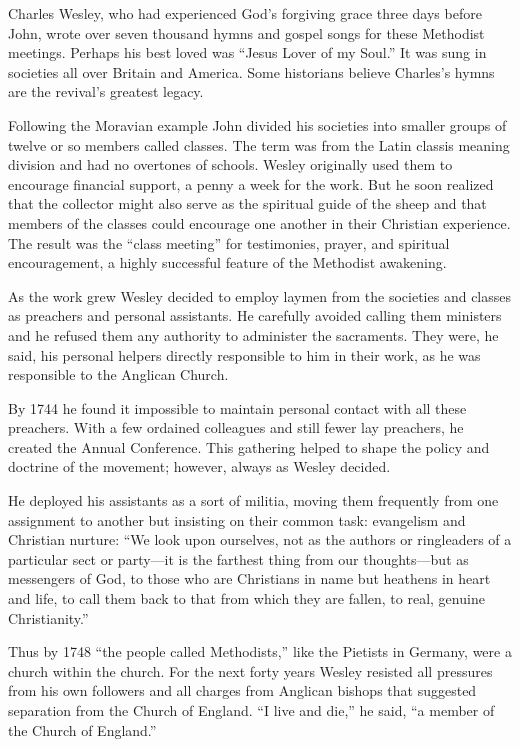 Charles Wesley, who had experienced God’s forgiving grace three days before John, wrote over seven
thousand hymns and gospel songs for these Methodist meetings. Perhaps his best loved was “Jesus
Lover of my Soul.” It was sung in societies all over Britain and America. Some historians believe
Charles’s hymns are the revival’s greatest legacy.

Following the Moravian example John divided his societies into smaller groups of twelve or so
members called classes. The term was from the Latin classis meaning division and had no overtones of
schools. Wesley originally used them to encourage financial support, a penny a week for the work.
But he soon realized that the collector might also serve as the spiritual guide of the sheep and
that members of the classes could encourage one another in their Christian experience. The result
was the “class meeting” for testimonies, prayer, and spiritual encouragement, a highly successful
feature of the Methodist awakening.

As the work grew Wesley decided to employ laymen from the societies and classes as preachers and
personal assistants. He carefully avoided calling them ministers and he refused them any authority
to administer the sacraments. They were, he said, his personal helpers directly responsible to him
in their work, as he was responsible to the Anglican Church.

By 1744 he found it impossible to maintain personal contact with all these preachers. With a few
ordained colleagues and still fewer lay preachers, he created the Annual Conference. This gathering
helped to shape the policy and doctrine of the movement; however, always as Wesley decided.

He deployed his assistants as a sort of militia, moving them frequently from one assignment to
another but insisting on their common task: evangelism and Christian nurture: “We look upon
ourselves, not as the authors or ringleaders of a particular sect or party—it is the farthest thing
from our thoughts—but as messengers of God, to those who are Christians in name but heathens in
heart and life, to call them back to that from which they are fallen, to real, genuine
Christianity.”

Thus by 1748 “the people called Methodists,” like the Pietists in Germany, were a church within the
church. For the next forty years Wesley resisted all pressures from his own followers and all
charges from Anglican bishops that suggested separation from the Church of England. “I live and
die,” he said, “a member of the Church of England.”


